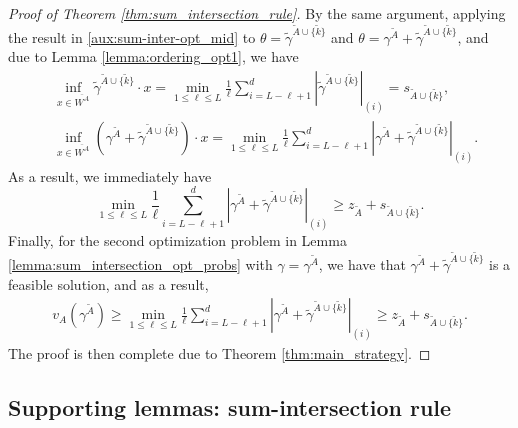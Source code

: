 \documentclass[aap,preprint]{imsart}
\theoremstyle{plain}
\theoremstyle{definition}
\begin{document}
\begin{appendix}
\begin{proof}[Proof of Theorem \ref{thm:sum_intersection_rule}]
By the same argument, applying the result in \eqref{aux:sum-inter-opt_mid} to $\theta = \tilde{\gamma}^{\tilde{A} \cup \{\tilde{k}\}}$ and 
$\theta = \gamma^{\tilde{A}} + \tilde{\gamma}^{\tilde{A} \cup \{\tilde{k}\}}$, and due to  Lemma \ref{lemma:ordering_opt1}, we have
\begin{align*}
&\inf_{x \in \overline{W^{{A}}}}  \tilde{\gamma}^{\tilde{A} \cup \{\tilde{k}\}} \cdot x  =      \min_{1 \leq \ell \leq L} \frac{1}{\ell} \sum_{i = L - \ell + 1}^{d} \left|\tilde{\gamma}^{\tilde{A} \cup \{\tilde{k}\}} \right|_{(i)} = s_{\tilde{A} \cup \{\tilde{k}\}}, \\
&\inf_{x \in \overline{W^{{A}}}}  \left( \gamma^{\tilde{A}}+\tilde{\gamma}^{\tilde{A} \cup \{\tilde{k}\}}\right) \cdot x  =      \min_{1 \leq \ell \leq L} \frac{1}{\ell} \sum_{i = L - \ell + 1}^{d} \left| \gamma^{\tilde{A}}+\tilde{\gamma}^{\tilde{A} \cup \{\tilde{k}\}}\right|_{(i)}.
\end{align*}
As a result, we immediately have
$$
  \min_{1 \leq \ell \leq L} \frac{1}{\ell} \sum_{i = L - \ell + 1}^{d} \left| \gamma^{\tilde{A}}+\tilde{\gamma}^{\tilde{A} \cup \{\tilde{k}\}}\right|_{(i)} \geq z_{\tilde{A}} + s_{\tilde{A} \cup \{\tilde{k}\}}.
$$
Finally, for the second optimization problem in Lemma \ref{lemma:sum_intersection_opt_probs} with $\gamma = \gamma^{\tilde{A}}$, we have that $\gamma^{\tilde{A}} + \tilde{\gamma}^{\tilde{A} \cup \{\tilde{k}\}}$ is a feasible solution, and as a result,
\begin{align*}
    v_{A}(\gamma^{\tilde{A}}) \geq  \min_{1 \leq \ell \leq L} \frac{1}{\ell} \sum_{i = L - \ell + 1}^{d} \left| \gamma^{\tilde{A}}+\tilde{\gamma}^{\tilde{A} \cup \{\tilde{k}\}}\right|_{(i)} \geq z_{\tilde{A}} + s_{\tilde{A} \cup \{\tilde{k}\}}.
\end{align*}
The proof is then complete due to Theorem \ref{thm:main_strategy}.
\end{proof}

\subsection{Supporting lemmas: sum-intersection rule}


\end{appendix}
\end{document}
